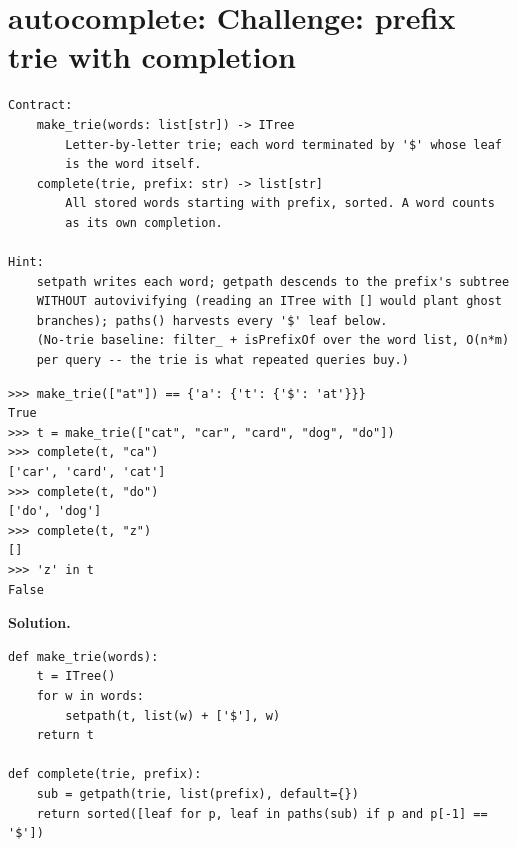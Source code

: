 \documentclass[10pt,letterpaper]{book}
\begin{document}
\section{autocomplete: Challenge: prefix trie with completion}
\begin{lstlisting}[style=ex]
Contract:
    make_trie(words: list[str]) -> ITree
        Letter-by-letter trie; each word terminated by '$' whose leaf
        is the word itself.
    complete(trie, prefix: str) -> list[str]
        All stored words starting with prefix, sorted. A word counts
        as its own completion.

Hint:
    setpath writes each word; getpath descends to the prefix's subtree
    WITHOUT autovivifying (reading an ITree with [] would plant ghost
    branches); paths() harvests every '$' leaf below.
    (No-trie baseline: filter_ + isPrefixOf over the word list, O(n*m)
    per query -- the trie is what repeated queries buy.)
\end{lstlisting}
\begin{lstlisting}[style=ex]
>>> make_trie(["at"]) == {'a': {'t': {'$': 'at'}}}
True
>>> t = make_trie(["cat", "car", "card", "dog", "do"])
>>> complete(t, "ca")
['car', 'card', 'cat']
>>> complete(t, "do")
['do', 'dog']
>>> complete(t, "z")
[]
>>> 'z' in t
False
\end{lstlisting}
\noindent\textbf{Solution.}
\begin{lstlisting}[style=code]
def make_trie(words):
    t = ITree()
    for w in words:
        setpath(t, list(w) + ['$'], w)
    return t

def complete(trie, prefix):
    sub = getpath(trie, list(prefix), default={})
    return sorted([leaf for p, leaf in paths(sub) if p and p[-1] == '$'])
\end{lstlisting}
\end{document}

